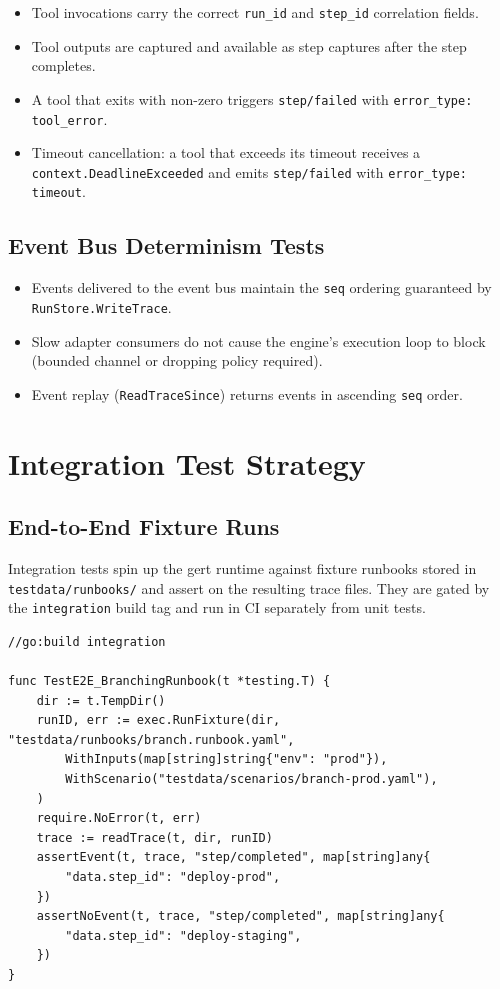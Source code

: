 \begin{itemize}
  \item Tool invocations carry the correct \texttt{run\_id} and \texttt{step\_id} correlation fields.
  \item Tool outputs are captured and available as step captures after the step completes.
  \item A tool that exits with non-zero triggers \texttt{step/failed} with \texttt{error\_type: tool\_error}.
  \item Timeout cancellation: a tool that exceeds its timeout receives a \texttt{context.DeadlineExceeded} and emits \texttt{step/failed} with \texttt{error\_type: timeout}.
\end{itemize}

\subsection{Event Bus Determinism Tests}

\begin{itemize}
  \item Events delivered to the event bus maintain the \texttt{seq} ordering guaranteed by \texttt{RunStore.WriteTrace}.
  \item Slow adapter consumers do not cause the engine's execution loop to block (bounded channel or dropping policy required).
  \item Event replay (\texttt{ReadTraceSince}) returns events in ascending \texttt{seq} order.
\end{itemize}

\section{Integration Test Strategy}

\subsection{End-to-End Fixture Runs}

Integration tests spin up the gert runtime against fixture runbooks stored in \texttt{testdata/runbooks/} and assert on the resulting trace files. They are gated by the \texttt{integration} build tag and run in CI separately from unit tests.

\begin{verbatim}
//go:build integration

func TestE2E_BranchingRunbook(t *testing.T) {
    dir := t.TempDir()
    runID, err := exec.RunFixture(dir, "testdata/runbooks/branch.runbook.yaml",
        WithInputs(map[string]string{"env": "prod"}),
        WithScenario("testdata/scenarios/branch-prod.yaml"),
    )
    require.NoError(t, err)
    trace := readTrace(t, dir, runID)
    assertEvent(t, trace, "step/completed", map[string]any{
        "data.step_id": "deploy-prod",
    })
    assertNoEvent(t, trace, "step/completed", map[string]any{
        "data.step_id": "deploy-staging",
    })
}
\end{verbatim}

